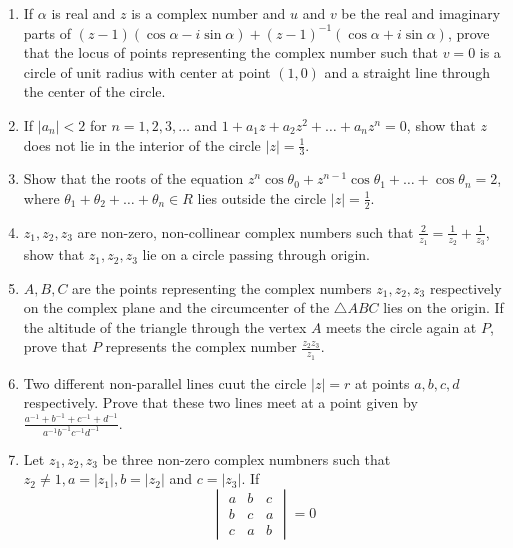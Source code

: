 \begin{enumerate}[resume]
\item If $\alpha$ is real and $z$ is a complex number and $u$ and $v$ be the real and imaginary parts of $(z - 1)(\cos\alpha -
  i\sin\alpha) + (z - 1)^{-1}(\cos\alpha + i\sin\alpha)$, prove that the locus of points representing the complex number such that
  $v =0$ is a circle of unit radius with center at point $(1, 0)$ and a straight line through the center of the circle.
\item If $|a_n| < 2$ for $n = 1, 2, 3, \ldots$ and $1 + a_1z + a_2z^2 + \ldots + a_nz^n = 0$, show that $z$ does not lie in the
  interior of the circle $|z| = \frac{1}{3}$.
\item Show that the roots of the equation $z^n\cos\theta_0 + z^{n - 1}\cos\theta_1 + \ldots + \cos\theta_n = 2$, where $\theta_1 +
  \theta_2 + \ldots + \theta_n\in R$ lies outside the circle $|z| = \frac{1}{2}$.
\item $z_1, z_2, z_3$ are non-zero, non-collinear complex numbers such that $\frac{2}{z_1} = \frac{1}{z_2} + \frac{1}{z_3}$, show
  that $z_1, z_2, z_3$ lie on a circle passing through origin.
\item $A, B, C$ are the points representing the complex numbers $z_1,z_2,z_3$ respectively on the complex plane and the
  circumcenter of the $\triangle ABC$ lies on the origin. If the altitude of the triangle through the vertex $A$ meets the circle
  again at $P$, prove that $P$ represents the complex number $\frac{z_2z_3}{z_1}$.
\item Two different non-parallel lines cuut the circle $|z| = r$ at points $a, b, c, d$ respectively. Prove that these two lines
  meet at a point given by $\frac{a^{-1} + b^{-1} + c^{-1} + d^{-1}}{a^{-1}b^{-1}c^{-1}d^{-1}}$.
\item Let $z_1, z_2, z_3$ be three non-zero complex numbners such that $z_2\neq 1, a = |z_1|, b = |z_2|$ and $c =
  |z_3|$. If $$\begin{vmatrix} a & b & c\\ b & c & a\\ c & a & b\end{vmatrix} = 0$$


\end{enumerate}
